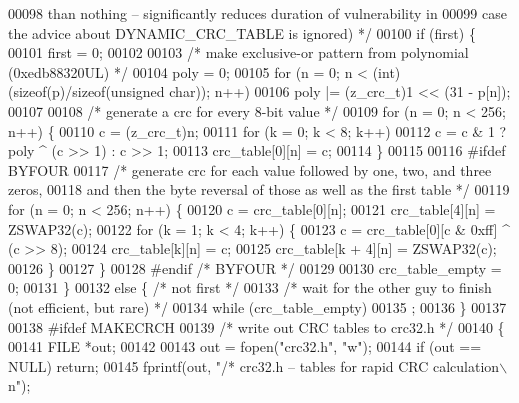\begin{DoxyCode}
00098 \textcolor{comment}{       than nothing -- significantly reduces duration of vulnerability in}
00099 \textcolor{comment}{       case the advice about DYNAMIC\_CRC\_TABLE is ignored) */}
00100     \textcolor{keywordflow}{if} (first) \{
00101         first = 0;
00102 
00103         \textcolor{comment}{/* make exclusive-or pattern from polynomial (0xedb88320UL) */}
00104         poly = 0;
00105         \textcolor{keywordflow}{for} (n = 0; n < (int)(\textcolor{keyword}{sizeof}(p)/\textcolor{keyword}{sizeof}(\textcolor{keywordtype}{unsigned} \textcolor{keywordtype}{char})); n++)
00106             poly |= (z\_crc\_t)1 << (31 - p[n]);
00107 
00108         \textcolor{comment}{/* generate a crc for every 8-bit value */}
00109         \textcolor{keywordflow}{for} (n = 0; n < 256; n++) \{
00110             c = (z\_crc\_t)n;
00111             \textcolor{keywordflow}{for} (k = 0; k < 8; k++)
00112                 c = c & 1 ? poly ^ (c >> 1) : c >> 1;
00113             crc\_table[0][n] = c;
00114         \}
00115 
00116 \textcolor{preprocessor}{#ifdef BYFOUR}
00117         \textcolor{comment}{/* generate crc for each value followed by one, two, and three zeros,}
00118 \textcolor{comment}{           and then the byte reversal of those as well as the first table */}
00119         \textcolor{keywordflow}{for} (n = 0; n < 256; n++) \{
00120             c = crc\_table[0][n];
00121             crc\_table[4][n] = ZSWAP32(c);
00122             \textcolor{keywordflow}{for} (k = 1; k < 4; k++) \{
00123                 c = crc\_table[0][c & 0xff] ^ (c >> 8);
00124                 crc\_table[k][n] = c;
00125                 crc\_table[k + 4][n] = ZSWAP32(c);
00126             \}
00127         \}
00128 \textcolor{preprocessor}{#endif }\textcolor{comment}{/* BYFOUR */}\textcolor{preprocessor}{}
00129 
00130         crc\_table\_empty = 0;
00131     \}
00132     \textcolor{keywordflow}{else} \{      \textcolor{comment}{/* not first */}
00133         \textcolor{comment}{/* wait for the other guy to finish (not efficient, but rare) */}
00134         \textcolor{keywordflow}{while} (crc\_table\_empty)
00135             ;
00136     \}
00137 
00138 \textcolor{preprocessor}{#ifdef MAKECRCH}
00139     \textcolor{comment}{/* write out CRC tables to crc32.h */}
00140     \{
00141         FILE *out;
00142 
00143         out = fopen(\textcolor{stringliteral}{"crc32.h"}, \textcolor{stringliteral}{"w"});
00144         \textcolor{keywordflow}{if} (out == NULL) \textcolor{keywordflow}{return};
00145         fprintf(out, \textcolor{stringliteral}{"/* crc32.h -- tables for rapid CRC calculation\(\backslash\)n"});

\end{DoxyCode}
